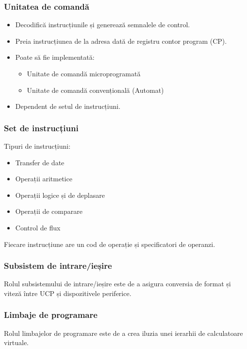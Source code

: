 \begin{frame}
    \frametitle{Unitatea de comandă}
    \begin{itemize}
        \item Decodifică instrucțiunile și generează semnalele de control.
        \item Preia instrucțiunea de la adresa dată de registru contor program (CP).
        \item Poate să fie implementată:
        \begin{itemize}
            \item Unitate de comandă microprogramată
            \item Unitate de comandă convențională (Automat)
        \end{itemize}
        \item Dependent de setul de instrucțiuni.
    \end{itemize}
\end{frame}

\begin{frame}
    \frametitle{Set de instrucțiuni}
    Tipuri de instrucțiuni:
    \begin{itemize}
        \item Transfer de date
        \item Operații aritmetice
        \item Operații logice și de deplasare
        \item Operații de comparare
        \item Control de flux
    \end{itemize}
    Fiecare instrucțiune are un cod de operație și specificatori de operanzi.
\end{frame}

\begin{frame}
    \frametitle{Subsistem de intrare/ieșire}
    Rolul subsistemului de intrare/ieșire este de a asigura conversia de format și viteză între UCP și dispozitivele periferice.
\end{frame}

\begin{frame}
    \frametitle{Limbaje de programare}
    \newsavebox{\asciiplcomp}
    \begin{lrbox}{\asciiplcomp}
        \begin{varwidth}{\maxdimen}
        \end{varwidth}
    \end{lrbox}%

    \begin{figure}[h]
        \centering
        \scalebox{0.8}{\usebox{\asciiplcomp}}
    \end{figure}
    Rolul limbajelor de programare este de a crea iluzia unei ierarhii de calculatoare virtuale.
\end{frame}
